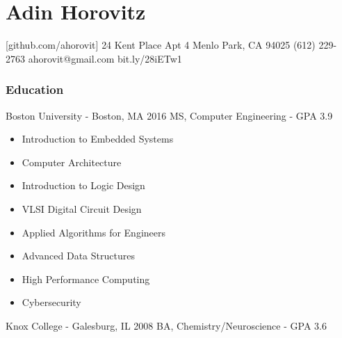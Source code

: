 \documentclass{tccv_AH}
\begin{document}
\sffamily

\part{Adin Horovitz}


\personal
    [github.com/ahorovit]
    {24 Kent Place Apt 4 \newline Menlo Park, CA 94025}
    {(612) 229-2763}
    {ahorovit@gmail.com}
    {bit.ly/28iETw1}


\vspace{-1em}

\section{Education}

\begin{yearlist}

\item[Boston University - Boston, MA]{2016}
     {MS, Computer Engineering - GPA 3.9}

\end{yearlist}


\vspace{-2em}
\begin{itemize}
    \itemsep-0.25em
    \itemindent2.5em
    \item{Introduction to Embedded Systems}
    \item{Computer Architecture}
    \item{Introduction to Logic Design}
    \item{VLSI Digital Circuit Design}
    \item{Applied Algorithms for Engineers}
    \item{Advanced Data Structures}
    \item{High Performance Computing}
    \item{Cybersecurity}

\end{itemize}

\begin{yearlist}

\item[Knox College - Galesburg, IL]{2008}
     {BA, Chemistry/Neuroscience - GPA 3.6}

\end{yearlist}
\end{document}

